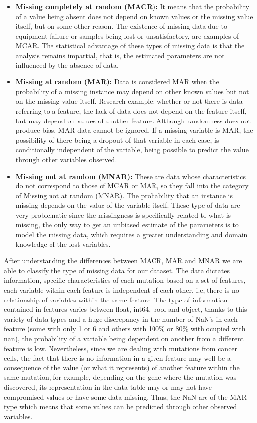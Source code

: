\begin{itemize}
  \item \textbf{Missing completely at random (MACR):} It means that the probability of a value being absent does not depend on known values or the missing value itself, but on some other reason. The existence of missing data due to equipment failure or samples being lost or unsatisfactory, are examples of MCAR. The statistical advantage of these types of missing data is that the analysis remains impartial, that is, the estimated parameters are not influenced by the absence of data.
  
  \item \textbf{Missing at random (MAR):} Data is considered MAR when the probability of a missing instance may depend on other known values but not on the missing value itself. Research example: whether or not there is data referring to a feature, the lack of data does not depend on the feature itself, but may depend on values of another feature. Although randomness does not produce bias, MAR data cannot be ignored. If a missing variable is MAR, the possibility of there being a dropout of that variable in each case, is conditionally independent of the variable, being possible to predict the value through other variables observed.

  \item \textbf{Missing not at random (MNAR):} These are data whose characteristics do not correspond to those of MCAR or MAR, so they fall into the category of Missing not at random (MNAR). The probability that an instance is missing depends on the value of the variable itself. These type of data are very problematic since the missingness is specifically related to what is missing, the only way to get an unbiased estimate of the parameters is to model the missing data, which requires a greater understanding and domain knowledge of the lost variables.
 
\end{itemize}

After understanding the differences between MACR, MAR and MNAR we are able to classify the type of missing data for our dataset. The data dictates information, specific characteristics of each mutation based on a set of features, each variable within each feature is independent of each other, i.e, there is no relationship of variables within the same feature. The type of information contained in features varies between float, int64, bool and object, thanks to this variety of data types and a huge discrepancy in the number of NaN's in each feature (some with only 1 or 6 and others with 100\% or 80\% with ocupied with nan), the probability of a variable being dependent on another from a different feature is low. Nevertheless, since we are dealing with mutations from cancer cells, the fact that there is no information in a given feature may well be a consequence of the value (or what it represents) of another feature within the same mutation, for example, depending on the gene where the mutation was discovered, its representation in the data table may or may not have compromised values or have some data missing. Thus, the NaN are of the MAR type which means that some values can be predicted through other observed variables.

